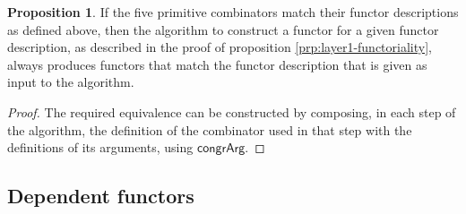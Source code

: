 \documentclass[a4paper]{article}
\theoremstyle{definition}
\newtheorem{proposition}[definition]{Proposition}
\theoremstyle{remark}
\newcommand{\nm}{\mathsf}
\newcommand{\congrArg}{\nm{congrArg}}
\begin{document}
\begin{proposition}
  If the five primitive combinators match their functor descriptions as defined above, then the
  algorithm to construct a functor for a given functor description, as described in the proof of
  proposition \ref{prp:layer1-functoriality}, always produces functors that match the functor
  description that is given as input to the algorithm.
\end{proposition}
\vspace{-1ex}
\begin{proof}
  The required equivalence can be constructed by composing, in each step of the algorithm, the
  definition of the combinator used in that step with the definitions of its arguments, using
  $\congrArg.$
\end{proof}

\subsection{Dependent functors}
\end{document}

